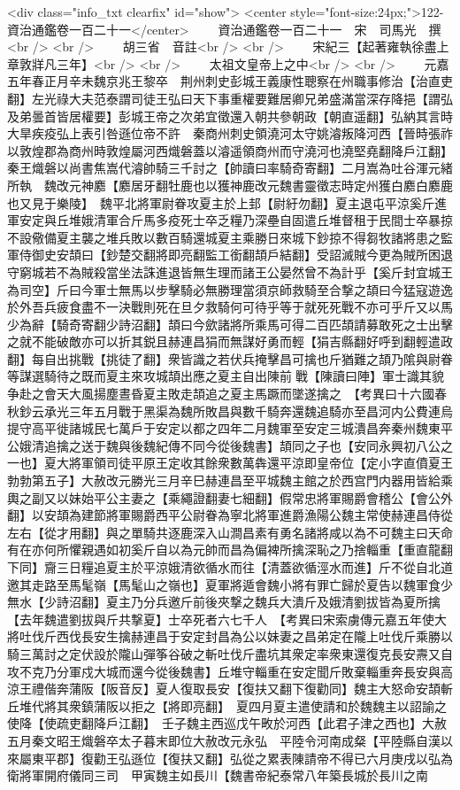 <div class="info_txt clearfix" id="show">
<center style="font-size:24px;">122-資治通鑑卷一百二十一</center>
  　　資治通鑑卷一百二十一　宋　司馬光　撰<br />
<br />
　　胡三省　音註<br />
<br />
　　宋紀三【起著雍執徐盡上章敦牂凡三年】<br />
<br />
　　太祖文皇帝上之中<br />
<br />
　　元嘉五年春正月辛未魏京兆王黎卒　荆州刺史彭城王義康性聰察在州職事修治【治直吏翻】左光祿大夫范泰謂司徒王弘曰天下事重權要難居卿兄弟盛滿當深存降挹【謂弘及弟曇首皆居權要】彭城王帝之次弟宜徵還入朝共參朝政【朝直遥翻】弘納其言時大旱疾疫弘上表引咎遜位帝不許　秦商州刺史領澆河太守姚濬叛降河西【晉時張祚以敦煌郡為商州時敦煌屬河西熾磐蓋以濬遥領商州而守澆河也澆堅堯翻降戶江翻】秦王熾磐以尚書焦嵩代濬帥騎三千討之【帥讀曰率騎奇寄翻】二月嵩為吐谷渾元緒所執　魏改元神䴥【䴥居牙翻牡鹿也以獲神鹿改元魏書靈徵志時定州獲白䴥白䴥鹿也又見于樂陵】　魏平北將軍尉眷攻夏主於上邽【尉紆勿翻】夏主退屯平涼奚斤進軍安定與丘堆娥清軍合斤馬多疫死士卒乏糧乃深壘自固遣丘堆督租于民間士卒暴掠不設儆備夏主襲之堆兵敗以數百騎還城夏主乘勝日來城下鈔掠不得芻牧諸將患之監軍侍御史安頡曰【鈔楚交翻將即亮翻監工銜翻頡戶結翻】受詔滅賊今更為賊所困退守窮城若不為賊殺當坐法誅進退皆無生理而諸王公晏然曾不為計乎【奚斤封宜城王為司空】斤曰今軍士無馬以步擊騎必無勝理當須京師救騎至合撃之頡曰今猛寇遊逸於外吾兵疲食盡不一決戰則死在旦夕救騎何可待乎等于就死死戰不亦可乎斤又以馬少為辭【騎奇寄翻少詩沼翻】頡曰今歛諸將所乘馬可得二百匹頡請募敢死之士出擊之就不能破敵亦可以折其鋭且赫連昌狷而無謀好勇而輕【狷吉縣翻好呼到翻輕遣政翻】每自出挑戰【挑徒了翻】衆皆識之若伏兵掩擊昌可擒也斤猶難之頡乃隂與尉眷等謀選騎待之既而夏主來攻城頡出應之夏主自出陳前戰【陳讀曰陣】軍士識其貌争赴之會天大風揚塵晝昏夏主敗走頡追之夏主馬蹶而墜遂擒之　【考異曰十六國春秋鈔云承光三年五月戰于黑渠為魏所敗昌與數千騎奔還魏追騎亦至昌河内公費連烏提守高平徙諸城民七萬戶于安定以都之四年二月魏軍至安定三城潰昌奔秦州魏東平公娥清追擒之送于魏與後魏紀傳不同今從後魏書】頡同之子也【安同永興初八公之一也】夏大將軍領司徒平原王定收其餘衆數萬犇還平涼即皇帝位【定小字直僨夏王勃勃第五子】大赦改元勝光三月辛巳赫連昌至平城魏主館之於西宫門内器用皆給乘輿之副又以妹始平公主妻之【乘繩證翻妻七細翻】假常忠將軍賜爵會稽公【會公外翻】以安頡為建節將軍賜爵西平公尉眷為寧北將軍進爵漁陽公魏主常使赫連昌侍從左右【從才用翻】與之單騎共逐鹿深入山澗昌素有勇名諸將咸以為不可魏主曰天命有在亦何所懼親遇如初奚斤自以為元帥而昌為偏裨所擒深恥之乃捨輜重【重直龍翻下同】齎三日糧追夏主於平涼娥清欲循水而往【清蓋欲循涇水而進】斤不從自北道邀其走路至馬髦嶺【馬髦山之嶺也】夏軍將遁會魏小將有罪亡歸於夏告以魏軍食少無水【少詩沼翻】夏主乃分兵邀斤前後夾撃之魏兵大潰斤及娥清劉拔皆為夏所擒【去年魏遣劉拔與斤共撃夏】士卒死者六七千人　【考異曰宋索虜傳元嘉五年使大將吐伐斤西伐長安生擒赫連昌于安定封昌為公以妹妻之昌弟定在隴上吐伐斤乘勝以騎三萬討之定伏設於隴山彈筝谷破之斬吐伐斤盡坑其衆定率衆東還復克長安燾又自攻不克乃分軍戍大城而還今從後魏書】丘堆守輜重在安定聞斤敗棄輜重奔長安與高涼王禮偕奔蒲阪【阪音反】夏人復取長安【復扶又翻下復勸同】魏主大怒命安頡斬丘堆代將其衆鎮蒲阪以拒之【將即亮翻】　夏四月夏主遣使請和於魏魏主以詔諭之使降【使疏吏翻降戶江翻】　壬子魏主西巡戊午畋於河西【此君子津之西也】大赦　五月秦文昭王熾磐卒太子暮末即位大赦改元永弘　平陸令河南成粲【平陸縣自漢以來屬東平郡】復勸王弘遜位【復扶又翻】弘從之累表陳請帝不得已六月庚戌以弘為衛將軍開府儀同三司　甲寅魏主如長川【魏書帝紀泰常八年築長城於長川之南
